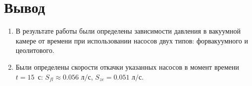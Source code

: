 \documentclass[a4paper, 12pt]{article}
\begin{document}
\section{Вывод}

\begin{enumerate}
	\item В результате работы были определены зависимости давления в вакуумной камере от времени при использовании насосов двух типов: форвакуумного и цеолитового.
	
	\item Были определены скорости откачки указанных насосов в момент времени $t=15$~с: $\boxed{S_{fl} \approx 0.056\text{ л/с}}$, $\boxed{S_{ze} = 0.051 \text{ л/с}}$.
\end{enumerate}
\end{document}
